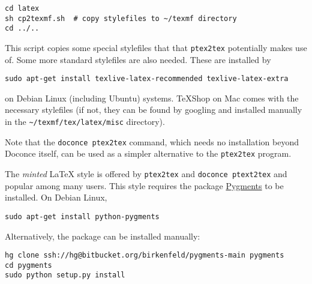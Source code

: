 \documentclass[%
oneside,                 %
final,                   %
10pt]{article}
\begin{document}
\vspace{4pt}
\begin{Verbatim}[numbers=none,frame=lines,label=\fbox{{\tiny Terminal}},fontsize=\fontsize{9pt}{9pt},
labelposition=topline,framesep=2.5mm,framerule=0.7pt]
cd latex
sh cp2texmf.sh  # copy stylefiles to ~/texmf directory
cd ../..
\end{Verbatim}
This script copies some special stylefiles that
that {\fontsize{10pt}{10pt}\Verb!ptex2tex!} potentially makes use of. Some more standard stylefiles
are also needed. These are installed by

\vspace{4pt}
\begin{Verbatim}[numbers=none,frame=lines,label=\fbox{{\tiny Terminal}},fontsize=\fontsize{9pt}{9pt},
labelposition=topline,framesep=2.5mm,framerule=0.7pt]
sudo apt-get install texlive-latex-recommended texlive-latex-extra
\end{Verbatim}
on Debian Linux (including Ubuntu) systems. TeXShop on Mac comes with
the necessary stylefiles (if not, they can be found by googling and installed
manually in the {\fontsize{10pt}{10pt}\Verb!~/texmf/tex/latex/misc!} directory).

Note that the {\fontsize{10pt}{10pt}\Verb!doconce ptex2tex!} command, which needs no installation
beyond Doconce itself, can be used as a simpler alternative to the {\fontsize{10pt}{10pt}\Verb!ptex2tex!}
program.

The \emph{minted} {\LaTeX} style is offered by {\fontsize{10pt}{10pt}\Verb!ptex2tex!} and {\fontsize{10pt}{10pt}\Verb!doconce ptext2tex!}
and popular among many
users. This style requires the package \href{{http://pygments.org}}{Pygments}
to be installed. On Debian Linux,
\vspace{4pt}
\begin{Verbatim}[numbers=none,frame=lines,label=\fbox{{\tiny Terminal}},fontsize=\fontsize{9pt}{9pt},
labelposition=topline,framesep=2.5mm,framerule=0.7pt]
sudo apt-get install python-pygments
\end{Verbatim}
Alternatively, the package can be installed manually:
\vspace{4pt}
\begin{Verbatim}[numbers=none,frame=lines,label=\fbox{{\tiny Terminal}},fontsize=\fontsize{9pt}{9pt},
labelposition=topline,framesep=2.5mm,framerule=0.7pt]
hg clone ssh://hg@bitbucket.org/birkenfeld/pygments-main pygments
cd pygments
sudo python setup.py install
\end{Verbatim}
\end{document}
